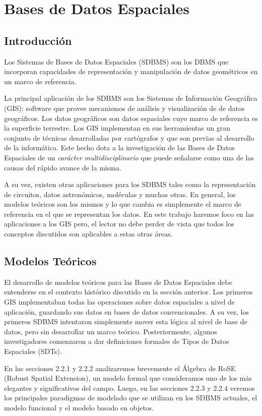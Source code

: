 \chapter{Bases de Datos Espaciales}  \label{cap:e}

\section{Introducción}

Los Sistemas de Bases de Datos Espaciales (SDBMS) son los DBMS que incorporan capacidades de representación y manipulación de datos geométricos en un marco de referencia.

La principal aplicación de los SDBMS son los Sistemas de Información Geográfica (GIS): software que provee mecanismos de análisis y visualización de de datos geográficos. Los datos geográficos son datos espaciales cuyo marco de referencia  es la superficie terrestre. Los GIS implementan en sus herramientas un gran conjunto de técnicas desarrolladas por cartógrafos y que son previas al desarrollo de la informática. Este hecho dota a la investigación de las Bases de Datos Espaciales de un \emph{carácter multidisciplinario} que puede señalarse como una de las causas del rápido avance de la misma.

A su vez, existen otras aplicaciones para los SDBMS tales como la representación de circuitos, datos astronómicos, moléculas y muchas otras. En general, los modelos teóricos son los mismos y lo que cambia es simplemente el marco de referencia en el que se representan los datos. En este trabajo haremos foco en las aplicaciones a los GIS pero, el lector no debe perder de vista que todos los conceptos discutidos son aplicables a estas otras áreas.

\section{Modelos Teóricos}
El desarrollo de modelos teóricos para las Bases de Datos Espaciales debe entenderse en el contexto histórico discutido en la sección anterior. Los primeros GIS implementaban todas las operaciones sobre datos espaciales a nivel de aplicación, guardando sus datos en bases de datos convencionales. A su vez, los primeros SDBMS intentaron simplemente mover esta lógica al nivel de base de datos, pero sin desarrollar un marco teórico. 
Posteriormente, algunos investigadores comenzaron a dar definiciones formales de Tipos de Datos Espaciales (SDTs).

En las secciones 2.2.1 y 2.2.2 analizaremos brevemente el Álgebra de RoSE (Robust Spatial Extension), un modelo formal que consideramos uno de los más elegantes y significativos del campo. Luego, en las secciones 2.2.3 y 2.2.4 veremos los principales paradigmas de modelado que se utilizan en los SDBMS actuales, el modelo funcional y el modelo basado en objetos.

